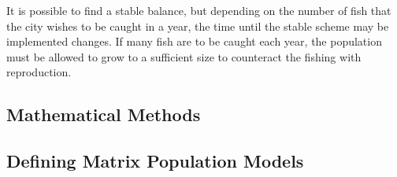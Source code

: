 \documentclass{article}
\begin{document}
    It is possible to find a stable balance, but depending on the number of fish that the city wishes to be caught in a year, the time until the stable scheme may be implemented changes.
    If many fish are to be caught each year, the population must be allowed to grow to a sufficient size to counteract the fishing with reproduction.

    \newpage
    \begin{center}
        \section{Mathematical Methods}\label{sec:mathematical-methods}
    \end{center}

    \subsection{Defining Matrix Population Models}\label{subsec:defining-matrix-population-models}
\end{document}
